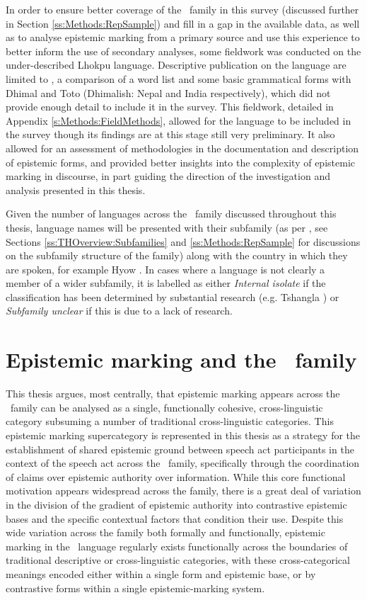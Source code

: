 In order to ensure better coverage of the \lfam\ family in this survey (discussed further in Section \ref{ss:Methods:RepSample}) and fill in a gap in the available data, as well as to analyse epistemic marking from a primary source and use this experience to better inform the use of secondary analyses, some fieldwork was conducted on the under-described Lhokpu language. Descriptive publication on the language are limited to , a comparison of a word list and some basic grammatical forms with Dhimal and Toto (Dhimalish: Nepal and India respectively), which did not provide enough detail to include it in the survey. This fieldwork, detailed in Appendix \ref{s:Methods:FieldMethods}, allowed for the language to be included in the survey though its findings are at this stage still very preliminary. It also allowed for an assessment of methodologies in the documentation and description of epistemic forms, and provided better insights into the complexity of epistemic marking in discourse, in part guiding the direction of the investigation and analysis presented in this thesis.

Given the number of languages across the \lfam\ family discussed throughout this thesis, language names will be presented with their subfamily (as per , see Sections \ref{ss:THOverview:Subfamilies} and \ref{ss:Methods:RepSample} for discussions on the subfamily structure of the family) along with the country in which they are spoken, for example Hyow \cite[Kukish: Myanmar,][]{Zakaria2018}. In cases where a language is not clearly a member of a wider subfamily, it is labelled as either \textit{Internal isolate} if the classification has been determined by substantial research (e.g. Tshangla \cite[Internal isolate: Bhutan,][]{Grollmann2020}) or \textit{Subfamily unclear} if this is due to a lack of research.


\section{Epistemic marking and the \lfam\ family}\label{s:Intro:Thesis}
This thesis argues, most centrally, that epistemic marking appears across the \lfam\ family can be analysed as a single, functionally cohesive, cross-linguistic category subsuming a number of traditional cross-linguistic categories. This epistemic marking supercategory is represented in this thesis as a strategy for the establishment of shared epistemic ground between speech act participants in the context of the speech act across the \lfam\ family, specifically through the coordination of claims over epistemic authority over information. While this core functional motivation appears widespread across the family, there is a great deal of variation in the division of the gradient of epistemic authority into contrastive epistemic bases and the specific contextual factors that condition their use. Despite this wide variation across the family both formally and functionally, epistemic marking in the \lfam\ language regularly exists functionally across the boundaries of traditional descriptive or cross-linguistic categories, with these cross-categorical meanings encoded either within a single form and epistemic base, or by contrastive forms within a single epistemic-marking system.

